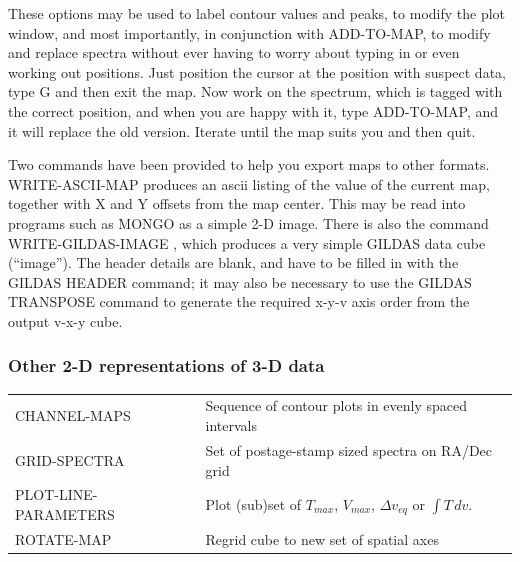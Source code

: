 \documentclass[11pt,twoside]{report}
\begin{document}
These options may be used to label contour values and peaks, to modify the
plot window, and most importantly, in conjunction with ADD-TO-MAP, to modify
and replace spectra without ever having to worry about typing in or even
working out positions.  Just position the cursor
at the position with suspect data, type G and then exit the map. Now work on
the spectrum, which is tagged with the correct position, and when you are happy
with it, type ADD-TO-MAP, and it will replace the old version. Iterate until
the map suits you and then quit. 

Two commands have been provided to help you export maps to other formats.
WRITE-ASCII-MAP produces an ascii listing of the
value of the current map, together with X and Y offsets from the map center.
This may be read into programs such as MONGO
as a simple 2-D image. There
is also the command WRITE-GILDAS-IMAGE
,
which produces a very simple
GILDAS data cube (``image''). The header details are blank, and have to be
filled in with the GILDAS HEADER command; it may also be necessary to
use the GILDAS TRANSPOSE command to generate the required x-y-v axis
order from the output v-x-y cube.


\subsubsection{Other 2-D representations of 3-D data}

\begin{tabular}{ll}
CHANNEL-MAPS            & Sequence of contour plots in evenly spaced intervals\\
GRID-SPECTRA            & Set of postage-stamp sized spectra on RA/Dec grid\\
PLOT-LINE-PARAMETERS    & Plot (sub)set of $T_{max}$, $V_{max}$,
                          $\Delta v_{eq}$ or $\int T\,dv$.\\
ROTATE-MAP              & Regrid cube to new set of spatial axes\\
\end{tabular}
\end{document}

